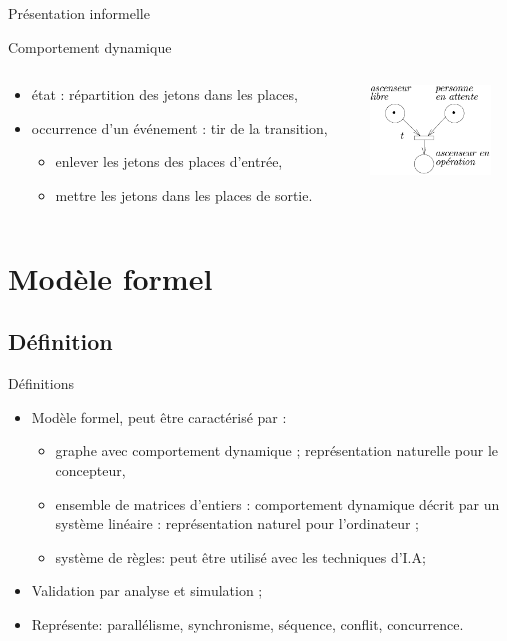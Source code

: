 \documentclass[compress]{beamer}
\begin{document}
\begin{frame}{Présentation informelle}
\begin{block}{Comportement dynamique}
\begin{columns}
	\begin{column}{.7\textwidth}
	\begin{itemize}
	\item état : répartition des jetons dans les places,
	\item occurrence d'un événement : tir de la transition,
		\begin{itemize}
		\item  enlever les jetons des places d'entrée,
		\item  mettre les jetons dans les places de sortie.
		\end{itemize}
	\end{itemize}
	\end{column}	
	\begin{column}{.3\textwidth}
		\includegraphics[width=3.2cm]{frdp}
	\end{column}
\end{columns}
\end{block}
\end{frame}

\section{Modèle formel}
\subsection{Définition}
\begin{frame}{Définitions}
\begin{itemize}
\item Modèle formel, peut être caractérisé par :
	\begin{itemize}
	\item graphe avec comportement dynamique ; représentation naturelle pour le concepteur,
	\item ensemble de matrices d'entiers : comportement dynamique décrit par un système linéaire :  représentation naturel pour l'ordinateur ;
	\item système de règles: peut être utilisé avec les techniques d'I.A;
	\end{itemize}     
\item Validation par analyse et simulation ;
\item Représente: parallélisme, synchronisme, séquence, conflit, concurrence.
\end{itemize}
\end{frame}
 
\end{document}
